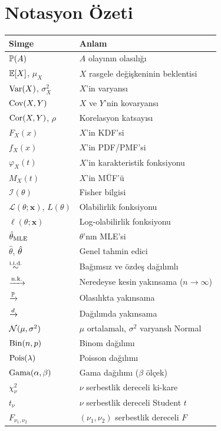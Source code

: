 \section{Notasyon Özeti}

\begin{center}
\begin{tabular}{p{4cm}p{9cm}}
\hline
\textbf{Simge} & \textbf{Anlam} \\
\hline
$\mathbb{P}(A)$ & $A$ olayının olasılığı \\
$\mathbb{E}[X]$, $\mu_X$ & $X$ rasgele değişkeninin beklentisi \\
$\operatorname{Var}(X)$, $\sigma_X^2$ & $X$'in varyansı \\
$\operatorname{Cov}(X,Y)$ & $X$ ve $Y$'nin kovaryansı \\
$\operatorname{Cor}(X,Y)$, $\rho$ & Korelasyon katsayısı \\
$F_X(x)$ & $X$'in KDF'si \\
$f_X(x)$ & $X$'in PDF/PMF'si \\
$\varphi_X(t)$ & $X$'in karakteristik fonksiyonu \\
$M_X(t)$ & $X$'in MÜF'ü \\
$\mathcal{I}(\theta)$ & Fisher bilgisi \\
$\mathcal{L}(\theta;\mathbf{x})$, $L(\theta)$ & Olabilirlik fonksiyonu \\
$\ell(\theta;\mathbf{x})$ & Log-olabilirlik fonksiyonu \\
$\hat{\theta}_{\text{MLE}}$ & $\theta$'nın MLE'si \\
$\hat\theta$, $\hat{\theta}$ & Genel tahmin edici \\
$\overset{\text{i.i.d.}}{\sim}$ & Bağımsız ve özdeş dağılımlı \\
$\xrightarrow{\text{n.k.}}$ & Neredeyse kesin yakınsama ($n\to\infty$) \\
$\xrightarrow{\mathbb{P}}$ & Olasılıkta yakınsama \\
$\xrightarrow{d}$ & Dağılımda yakınsama \\
$\mathcal{N}(\mu,\sigma^2)$ & $\mu$ ortalamalı, $\sigma^2$ varyanslı Normal \\
$\operatorname{Bin}(n,p)$ & Binom dağılımı \\
$\operatorname{Pois}(\lambda)$ & Poisson dağılımı \\
$\operatorname{Gama}(\alpha,\beta)$ & Gama dağılımı ($\beta$ ölçek) \\
$\chi^2_\nu$ & $\nu$ serbestlik dereceli ki-kare \\
$t_\nu$ & $\nu$ serbestlik dereceli Student $t$ \\
$F_{\nu_1,\nu_2}$ & $(\nu_1,\nu_2)$ serbestlik dereceli $F$ \\

\end{tabular}
\end{center}
